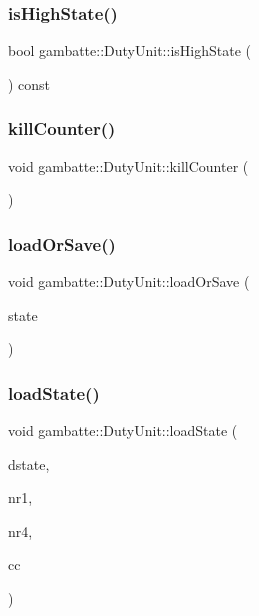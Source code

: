 \subsubsection{\texorpdfstring{is\+High\+State()}{isHighState()}}
{\footnotesize\ttfamily bool gambatte\+::\+Duty\+Unit\+::is\+High\+State (\begin{DoxyParamCaption}{ }\end{DoxyParamCaption}) const\hspace{0.3cm}{\ttfamily [inline]}}

\mbox{\label{classgambatte_1_1DutyUnit_a9def301fa5ff4359c4793a5fda3eb09c}} 
\subsubsection{\texorpdfstring{kill\+Counter()}{killCounter()}}
{\footnotesize\ttfamily void gambatte\+::\+Duty\+Unit\+::kill\+Counter (\begin{DoxyParamCaption}{ }\end{DoxyParamCaption})}

\mbox{\label{classgambatte_1_1DutyUnit_adfb8ad7e89551ee6c384e010fa51fba6}} 
\subsubsection{\texorpdfstring{load\+Or\+Save()}{loadOrSave()}}
{\footnotesize\ttfamily void gambatte\+::\+Duty\+Unit\+::load\+Or\+Save (\begin{DoxyParamCaption}\item[{\hyperlink{classgambatte_1_1loadsave}{loadsave} \&}]{state }\end{DoxyParamCaption})}

\mbox{\label{classgambatte_1_1DutyUnit_a64f049070cbd7ba7157410953186312b}} 
\subsubsection{\texorpdfstring{load\+State()}{loadState()}}
{\footnotesize\ttfamily void gambatte\+::\+Duty\+Unit\+::load\+State (\begin{DoxyParamCaption}\item[{\hyperlink{structgambatte_1_1SaveState_1_1SPU_1_1Duty}{Save\+State\+::\+S\+P\+U\+::\+Duty} const \&}]{dstate,  }\item[{unsigned}]{nr1,  }\item[{unsigned}]{nr4,  }\item[{unsigned}]{cc }\end{DoxyParamCaption})}

